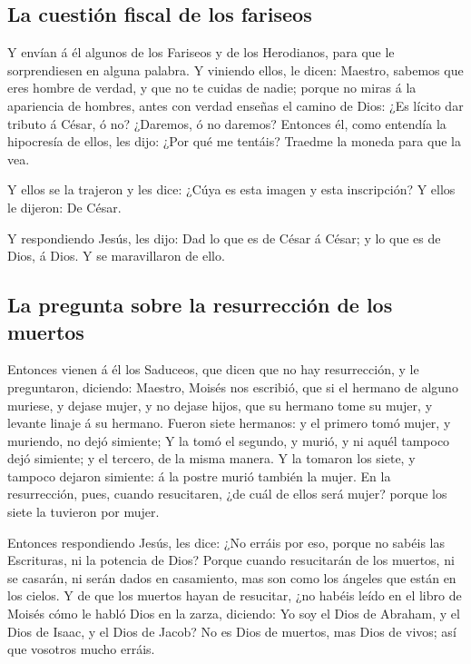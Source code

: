 \hypertarget{la-cuestiuxf3n-fiscal-de-los-fariseos}{%
\subsection{La cuestión fiscal de los
fariseos}\label{la-cuestiuxf3n-fiscal-de-los-fariseos}}

 Y envían á él algunos de los Fariseos y de los Herodianos,
para que le sorprendiesen en alguna palabra.  Y viniendo
ellos, le dicen: Maestro, sabemos que eres hombre de verdad, y que no te
cuidas de nadie; porque no miras á la apariencia de hombres, antes con
verdad enseñas el camino de Dios: ¿Es lícito dar tributo á César, ó no?
¿Daremos, ó no daremos?  Entonces él, como entendía la
hipocresía de ellos, les dijo: ¿Por qué me tentáis? Traedme la moneda
para que la vea.

 Y ellos se la trajeron y les dice: ¿Cúya es esta imagen y
esta inscripción? Y ellos le dijeron: De César.

 Y respondiendo Jesús, les dijo: Dad lo que es de César á
César; y lo que es de Dios, á Dios. Y se maravillaron de ello.

\hypertarget{la-pregunta-sobre-la-resurrecciuxf3n-de-los-muertos}{%
\subsection{La pregunta sobre la resurrección de los
muertos}\label{la-pregunta-sobre-la-resurrecciuxf3n-de-los-muertos}}

 Entonces vienen á él los Saduceos, que dicen que no hay
resurrección, y le preguntaron, diciendo:  Maestro, Moisés
nos escribió, que si el hermano de alguno muriese, y dejase mujer, y no
dejase hijos, que su hermano tome su mujer, y levante linaje á su
hermano.  Fueron siete hermanos: y el primero tomó mujer, y
muriendo, no dejó simiente;  Y la tomó el segundo, y murió,
y ni aquél tampoco dejó simiente; y el tercero, de la misma manera.
 Y la tomaron los siete, y tampoco dejaron simiente: á la
postre murió también la mujer.  En la resurrección, pues,
cuando resucitaren, ¿de cuál de ellos será mujer? porque los siete la
tuvieron por mujer.

 Entonces respondiendo Jesús, les dice: ¿No erráis por eso,
porque no sabéis las Escrituras, ni la potencia de Dios? 
Porque cuando resucitarán de los muertos, ni se casarán, ni serán dados
en casamiento, mas son como los ángeles que están en los cielos.
 Y de que los muertos hayan de resucitar, ¿no habéis leído
en el libro de Moisés cómo le habló Dios en la zarza, diciendo: Yo soy
el Dios de Abraham, y el Dios de Isaac, y el Dios de Jacob?
 No es Dios de muertos, mas Dios de vivos; así que vosotros
mucho erráis.

